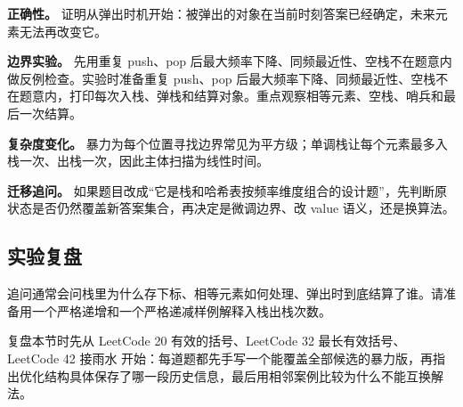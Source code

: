 \textbf{正确性。} 证明从弹出时机开始：被弹出的对象在当前时刻答案已经确定，未来元素无法再改变它。

\textbf{边界实验。} 先用重复 push、pop 后最大频率下降、同频最近性、空栈不在题意内做反例检查。实验时准备重复 push、pop 后最大频率下降、同频最近性、空栈不在题意内，打印每次入栈、弹栈和结算对象。重点观察相等元素、空栈、哨兵和最后一次结算。

\textbf{复杂度变化。} 暴力为每个位置寻找边界常见为平方级；单调栈让每个元素最多入栈一次、出栈一次，因此主体扫描为线性时间。

\textbf{迁移追问。} 如果题目改成“它是栈和哈希表按频率维度组合的设计题”，先判断原状态是否仍然覆盖新答案集合，再决定是微调边界、改 value 语义，还是换算法。

\subsection{实验复盘}

追问通常会问栈里为什么存下标、相等元素如何处理、弹出时到底结算了谁。请准备用一个严格递增和一个严格递减样例解释入栈出栈次数。

复盘本节时先从 LeetCode 20 有效的括号、LeetCode 32 最长有效括号、LeetCode 42 接雨水 开始：每道题都先手写一个能覆盖全部候选的暴力版，再指出优化结构具体保存了哪一段历史信息，最后用相邻案例比较为什么不能互换解法。
